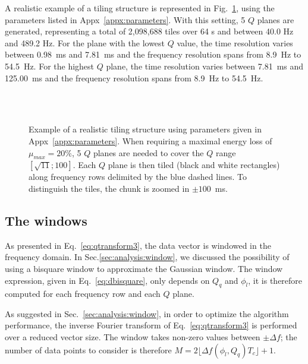 A realistic example of a tiling structure is represented in Fig.~\ref{fig:tiling}, using the parameters listed in Appx~\ref{appx:parameters}. With this setting, 5 $Q$ planes are generated, representing a total of 2,098,688 tiles over 64 s and between 40.0 Hz and 489.2 Hz. For the plane with the lowest $Q$ value, the time resolution varies between 0.98~ms and 7.81~ms and the frequency resolution spans from 8.9~Hz to 54.5~Hz. For the highest $Q$ plane, the time resolution varies between 7.81~ms and 125.00~ms and the frequency resolution spans from 8.9~Hz to 54.5~Hz.
\begin{figure}
  \center
    \\
    \\
  \caption{Example of a realistic tiling structure using parameters given in Appx~\ref{appx:parameters}. When requiring a maximal energy loss of $\mu_{max}=20\%$, 5 $Q$ planes are needed to cover the $Q$ range $[\sqrt{11}; 100]$. Each $Q$ plane is then tiled (black and white rectangles) along frequency rows delimited by the blue dashed lines. To distinguish the tiles, the chunk is zoomed in $\pm 100$~ms.}
  \label{fig:tiling}
\end{figure}

\subsection{The windows} \label{sec:algorithm:window}
As presented in Eq.~\ref{eq:qtransform3}, the data vector is windowed in the frequency domain. In Sec.\ref{sec:analysis:window}, we discussed the possibility of using a bisquare window to approximate the Gaussian window. The window expression, given in Eq.~\ref{eq:dbisquare}, only depends on $Q_q$ and $\phi_l$, it is therefore computed for each frequency row and each $Q$ plane.

As suggested in Sec.~\ref{sec:analysis:window}, in order to optimize the algorithm performance, the inverse Fourier transform of Eq.~\ref{eq:qtransform3} is performed over a reduced vector size. The window takes non-zero values between $\pm \Delta f$; the number of data points to consider is therefore $M=2\lfloor \Delta f(\phi_l,Q_q) T_c \rfloor + 1$.


